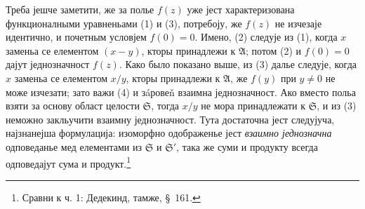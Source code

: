\documentclass[11pt]{article}
\providecommand{\Afield}{\mathfrak A}
\providecommand{\Sdomain}{\mathfrak S}
\begin{document}
Треба јешче заметити, же за полье \(f(z)\) уже јест характеризована функционалными уравненьами (1) и (3), потребоју, же \(f(z)\) не изчезаје идентично, и почетным условјем \(f(0)=0\). Имено, (2) следује из (1), когда \(x\) заменьа се елементом \((x-y)\), кторы принадлежи к \(\Afield\); потом (2) и \(f(0)=0\) дајут једнозначност \(f(z)\). Како было показано выше, из (3) далье следује, когда \(x\) заменьа се елементом \(x/y\), кторы принадлежи к \(\Afield\), же \(f(y)\) при \(y\ne0\) не може изчезати; зато важи (4) и зáровеň взаимна једнозначност. Ако вместо польа взяти за основу област целости \(\Sdomain\), тогда \(x/y\) не мора принадлежати к \(\Sdomain\), и из (3) неможно закльучити взаимну једнозначност. Тута достаточна јест следујуча, најзнанејша формулација: изоморфно одображенье јест {\itshape взаимно једнозначна} одповеданье мед елементами из \(\Sdomain\) и \(\Sdomain'\), така же суми и продукту всегда одповедајут сума и продукт.\footnote{Сравни к ч. 1: Дедекинд, тамже, \S\ 161.}

\clearpage
\end{document}
